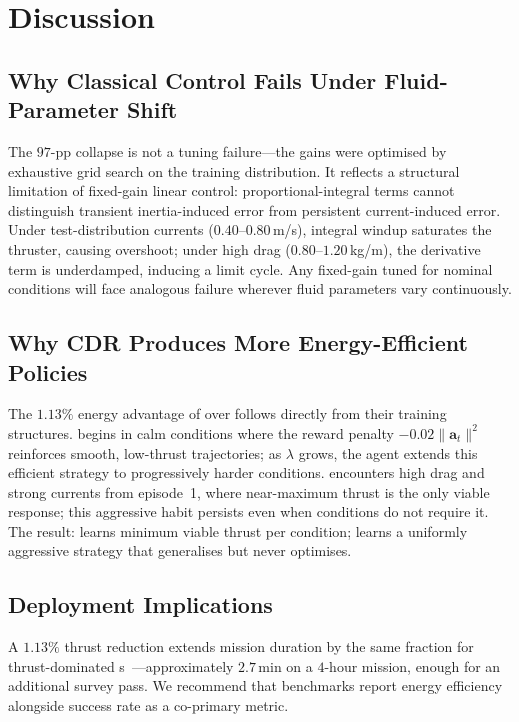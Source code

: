 
\section{Discussion}
\label{sec:discussion}

\subsection{Why Classical Control Fails Under Fluid-Parameter Shift}

The $97$-pp \PID{} collapse is not a tuning failure---the gains were
optimised by exhaustive grid search on the training distribution.
It reflects a structural limitation of fixed-gain linear control:
proportional-integral terms cannot distinguish transient inertia-induced
error from persistent current-induced error.
Under test-distribution currents ($0.40$--$0.80$\,m/s), integral
windup saturates the thruster, causing overshoot; under high drag
($0.80$--$1.20$\,kg/m), the derivative term is underdamped, inducing
a limit cycle.
Any fixed-gain \PID{} tuned for nominal \AUV{} conditions will face
analogous failure wherever fluid parameters vary continuously.

\subsection{Why CDR Produces More Energy-Efficient Policies}
\label{sec:energy_mechanism}

The $1.13\%$ energy advantage of \CDR{} over \UDR{} follows directly
from their training structures.
\CDR{} begins in calm conditions where the reward penalty
$-0.02\|\mathbf{a}_t\|^2$ reinforces smooth, low-thrust trajectories;
as $\lambda$ grows, the agent extends this efficient strategy to
progressively harder conditions.
\UDR{} encounters high drag and strong currents from episode~1, where
near-maximum thrust is the only viable response; this aggressive habit
persists even when conditions do not require it.
The result: \CDR{} learns minimum viable thrust per condition;
\UDR{} learns a uniformly aggressive strategy that generalises
but never optimises.

\subsection{Deployment Implications}

A $1.13\%$ thrust reduction extends mission duration by the same
fraction for thrust-dominated \AUV{}s~\cite{fossen2011}---approximately
$2.7$\,min on a $4$-hour mission, enough for an additional survey pass.
We recommend that \AUV{} \RL{} benchmarks report energy efficiency
alongside success rate as a co-primary metric.


